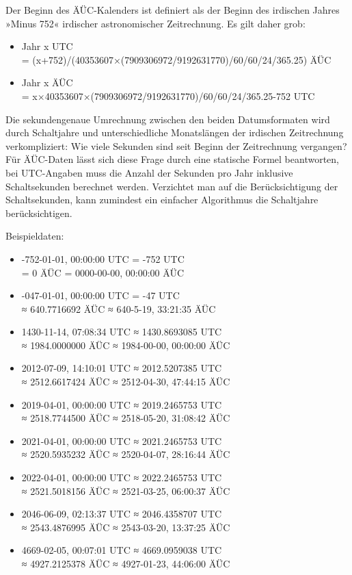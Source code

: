 Der Beginn des ÄÜC-Kalenders ist definiert als der Beginn des irdischen Jahres »Minus 752« irdischer astronomischer Zeitrechnung. Es gilt daher grob:

\begin{itemize}
    \item Jahr x UTC\\ = (x+752)/(40353607×(7909306972/9192631770)/60/60/24/365.25) ÄÜC
    \item Jahr x ÄÜC\\ = x×40353607×(7909306972/9192631770)/60/60/24/365.25-752 UTC
\end{itemize}

Die sekundengenaue Umrechnung zwischen den beiden Datumsformaten wird durch Schaltjahre und unterschiedliche Monatslängen der irdischen Zeitrechnung verkompliziert: Wie viele Sekunden sind seit Beginn der Zeitrechnung vergangen? Für ÄÜC-Daten lässt sich diese Frage durch eine statische Formel beantworten, bei UTC-Angaben muss die Anzahl der Sekunden pro Jahr inklusive Schaltsekunden berechnet werden. Verzichtet man auf die Berücksichtigung der Schaltsekunden, kann zumindest ein einfacher Algorithmus die Schaltjahre berücksichtigen.

Beispieldaten:

\begin{itemize}
    \item -752-01-01, 00:00:00 UTC = -752 UTC\\ = 0 ÄÜC = 0000-00-00, 00:00:00 ÄÜC
    \item -047-01-01, 00:00:00 UTC = -47 UTC\\ ≈ 640.7716692 ÄÜC ≈ 640-5-19, 33:21:35 ÄÜC
    \item 1430-11-14, 07:08:34 UTC ≈ 1430.8693085 UTC\\ ≈ 1984.0000000 ÄÜC ≈ 1984-00-00, 00:00:00 ÄÜC
    \item 2012-07-09, 14:10:01 UTC ≈ 2012.5207385 UTC\\ ≈ 2512.6617424 ÄÜC ≈ 2512-04-30, 47:44:15 ÄÜC
    \item 2019-04-01, 00:00:00 UTC ≈ 2019.2465753 UTC\\ ≈ 2518.7744500 ÄÜC ≈ 2518-05-20, 31:08:42 ÄÜC
    \item 2021-04-01, 00:00:00 UTC ≈ 2021.2465753 UTC\\ ≈ 2520.5935232 ÄÜC ≈ 2520-04-07, 28:16:44 ÄÜC
    \item 2022-04-01, 00:00:00 UTC ≈ 2022.2465753 UTC\\ ≈ 2521.5018156 ÄÜC ≈ 2521-03-25, 06:00:37 ÄÜC
    \item 2046-06-09, 02:13:37 UTC ≈ 2046.4358707 UTC\\ ≈ 2543.4876995 ÄÜC ≈ 2543-03-20, 13:37:25 ÄÜC
    \item 4669-02-05, 00:07:01 UTC ≈ 4669.0959038 UTC\\ ≈ 4927.2125378 ÄÜC ≈ 4927-01-23, 44:06:00 ÄÜC
\end{itemize}


